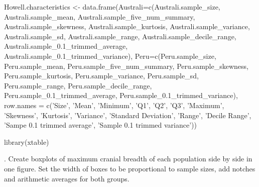 \documentclass[12pt, oneside]{report}\usepackage[]{graphicx}\usepackage[]{color}
\begin{document}
\begin{Schunk}
\begin{Sinput}
Howell.characteristics <- data.frame(Australi=c(Australi.sample_size, 
                        Australi.sample_mean, 
                        Australi.sample_five_num_summary, 
                        Australi.sample_skewness, 
                        Australi.sample_kurtosis, 
                        Australi.sample_variance, 
                        Australi.sample_sd, 
                        Australi.sample_range, 
                        Australi.sample_decile_range, 
                        Australi.sample_0.1_trimmed_average, 
                        Australi.sample_0.1_trimmed_variance),
                  Peru=c(Peru.sample_size, Peru.sample_mean, 
                         Peru.sample_five_num_summary, 
                         Peru.sample_skewness, 
                         Peru.sample_kurtosis, 
                         Peru.sample_variance, 
                         Peru.sample_sd, 
                         Peru.sample_range, 
                         Peru.sample_decile_range, 
                         Peru.sample_0.1_trimmed_average, 
                         Peru.sample_0.1_trimmed_variance),
                  row.names = c('Size', 'Mean', 'Minimum', 
                                'Q1', 'Q2', 'Q3', 'Maximum', 
                                'Skewness', 'Kurtosis', 
                                'Variance', 'Standard Deviation', 
                                'Range', 'Decile Range', 
                                'Sampe 0.1 trimmed average', 
                                'Sample 0.1 trimmed variance'))

library(xtable)
\end{Sinput}
\end{Schunk}

. Create boxplots of maximum cranial breadth of each population side by side in one figure. Set the width of boxes to be proportional to sample sizes, add notches and arithmetic averages for both groups.
\end{document}
